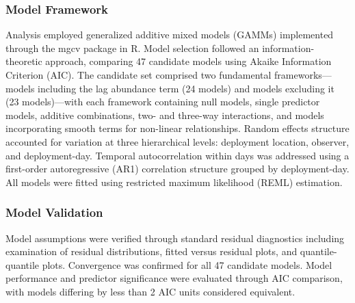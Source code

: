 \subsubsection{Model Framework}

Analysis employed generalized additive mixed models (GAMMs) implemented through the mgcv package in R. Model selection followed an information-theoretic approach, comparing 47 candidate models using Akaike Information Criterion (AIC). The candidate set comprised two fundamental frameworks—models including the lag abundance term (24 models) and models excluding it (23 models)—with each framework containing null models, single predictor models, additive combinations, two- and three-way interactions, and models incorporating smooth terms for non-linear relationships. Random effects structure accounted for variation at three hierarchical levels: deployment location, observer, and deployment-day. Temporal autocorrelation within days was addressed using a first-order autoregressive (AR1) correlation structure grouped by deployment-day. All models were fitted using restricted maximum likelihood (REML) estimation.

\subsubsection{Model Validation}

Model assumptions were verified through standard residual diagnostics including examination of residual distributions, fitted versus residual plots, and quantile-quantile plots. Convergence was confirmed for all 47 candidate models. Model performance and predictor significance were evaluated through AIC comparison, with models differing by less than 2 AIC units considered equivalent.

